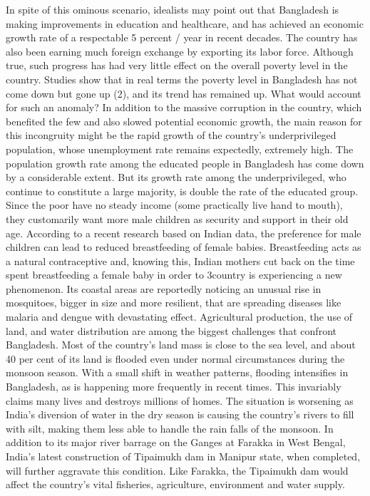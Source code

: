 \documentclass[a4paper,12pt]{article}
\begin{document}
In spite of this ominous scenario, idealists may point out that Bangladesh is making improvements in education and healthcare, and has achieved an economic growth rate of a respectable 5 percent / year in recent decades. The country has also been earning much foreign exchange by exporting its labor force. Although true, such progress has had very little effect on the overall poverty level in the country. Studies show that in real terms the poverty level in Bangladesh has not come down but gone up (2), and its trend has remained up. What would account for such an anomaly? In addition to the massive corruption in the country, which benefited the few and also slowed potential economic growth, the main reason for this incongruity might be the rapid growth of the country’s underprivileged population, whose unemployment rate remains expectedly, extremely high.   The population growth rate among the educated people in Bangladesh has come down by a considerable extent. But its growth rate among the underprivileged, who continue to constitute a large majority, is double the rate of the educated group. Since the poor have no steady income (some practically live hand to mouth), they customarily want more male children as security and support in their old age.   According to a recent research based on Indian data, the preference for male children can lead to reduced breastfeeding of female babies. Breastfeeding acts as a natural contraceptive and, knowing this, Indian mothers cut back on the time spent breastfeeding a female baby in order to 3country is experiencing a new phenomenon. Its coastal areas are reportedly noticing an unusual rise in mosquitoes, bigger in size and more resilient, that are spreading diseases like malaria and dengue with devastating effect.    Agricultural production, the use of land, and water distribution are among the biggest challenges that confront Bangladesh. Most of the country’s land mass is close to the sea level, and about 40 per cent of its land is flooded even under normal circumstances during the monsoon season. With a small shift in weather patterns, flooding intensifies in Bangladesh, as is happening more frequently in recent times. This invariably claims many lives and destroys millions of homes. The situation is worsening as India’s diversion of water in the dry season is causing the country’s rivers to fill with silt, making them less able to handle the rain falls of the monsoon. In addition to its major river barrage on the Ganges at Farakka in West Bengal, India’s latest construction of Tipaimukh dam in Manipur state, when completed, will further aggravate this condition. Like Farakka, the Tipaimukh dam would affect the country’s vital fisheries, agriculture, environment and water supply.\newline
\end{document}
